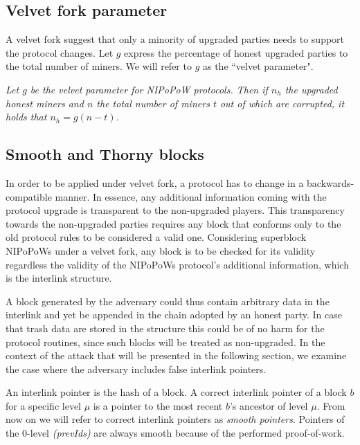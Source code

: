 \subsection{Velvet fork parameter}
A velvet fork suggest that only a minority of upgraded parties needs to support the protocol changes. Let $g$ express the percentage of honest upgraded parties to the total number of miners. We will refer to $g$ as the ``velvet parameter".

\begin{definition}
	\textit{Let $g$ be the velvet parameter for NIPoPoW protocols. Then if $n_h$ the upgraded honest miners and $n$ the total number of miners $t$ out of which are corrupted, it holds that $n_h = g (n - t)$.}
	\label{defn:velvet_honest_majority}
\end{definition}

\subsection{Smooth and Thorny blocks}
In order to be applied under velvet fork, a protocol has to change in a backwards-compatible manner. In essence, any additional information coming with the protocol upgrade is transparent to the non-upgraded players. This transparency towards the non-upgraded parties requires any block that conforms only to the old protocol rules to be considered a valid one. Considering superblock NIPoPoWs under a velvet fork, any block is to be checked for its validity regardless the validity of the NIPoPoWs protocol's additional information, which is the interlink structure.

A block generated by the adversary could thus contain arbitrary data in the interlink and yet be appended in the chain adopted by an honest party. In case that trash data are stored in the structure this could be of no harm for the protocol routines, since such blocks will be treated as non-upgraded. In the context of the attack that will be presented in the following section, we examine the case where the adversary includes false interlink pointers. 

An interlink pointer is the hash of a block. A correct interlink pointer of a block $b$ for a specific level $\mu$ is a pointer to the most recent $b$'s ancestor of level $\mu$. From now on we will refer to correct interlink pointers as \emph{smooth pointers}. Pointers of the 0-level \textit{(prevIds)} are always smooth because of the performed proof-of-work.

